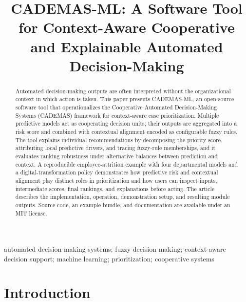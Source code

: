 \documentclass{interact}
\begin{document}

\title{CADEMAS-ML: A Software Tool for Context-Aware Cooperative and Explainable Automated Decision-Making}

\author{
}

\maketitle

\begin{abstract}
Automated decision-making outputs are often interpreted without the organizational context in which action is taken. This paper presents CADEMAS-ML, an open-source software tool that operationalizes the Cooperative Automated Decision-Making Systems (CADEMAS) framework for context-aware case prioritization. Multiple predictive models act as cooperating decision units; their outputs are aggregated into a risk score and combined with contextual alignment encoded as configurable fuzzy rules. The tool explains individual recommendations by decomposing the priority score, attributing local predictive drivers, and tracing fuzzy-rule memberships, and it evaluates ranking robustness under alternative balances between prediction and context. A reproducible employee-attrition example with four departmental models and a digital-transformation policy demonstrates how predictive risk and contextual alignment play distinct roles in prioritization and how users can inspect inputs, intermediate scores, final rankings, and explanations before acting. The article describes the implementation, operation, demonstration setup, and resulting module outputs. Source code, an example bundle, and documentation are available under an MIT license.
\end{abstract}

\begin{keywords}
automated decision-making systems; fuzzy decision making; context-aware decision support; machine learning; prioritization; cooperative systems
\end{keywords}

\section{Introduction}\label{sec:intro}
\end{document}
